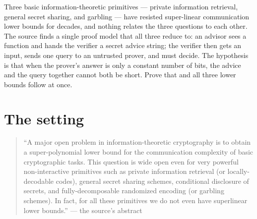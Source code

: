 \documentclass{aicr-conjecture}
\begin{document}

\vspace{0.4em}

\begin{informalconjecture}
Three basic information-theoretic primitives --- private information
retrieval, general secret sharing, and garbling --- have resisted
super-linear communication lower bounds for decades, and nothing relates
the three questions to each other. The source finds a single proof model
that all three reduce to: an advisor sees a function and hands the
verifier a secret advice string; the verifier then gets an input, sends
one query to an untrusted prover, and must decide. The hypothesis is that
when the prover's answer is only a constant number of bits, the advice
and the query together cannot both be short. Prove that and all three
lower bounds follow at once.
\end{informalconjecture}

\section{The setting}\label{sec:setting}

\begin{quote}\small
``A major open problem in information-theoretic cryptography is to obtain
a super-polynomial lower bound for the communication complexity of basic
cryptographic tasks. This question is wide open even for very powerful
non-interactive primitives such as private information retrieval (or
locally-decodable codes), general secret sharing schemes, conditional
disclosure of secrets, and fully-decomposable randomized encoding (or
garbling schemes). In fact, for all these primitives we do not even have
superlinear lower bounds.'' \hfill --- the source's abstract
\end{quote}
\end{document}
